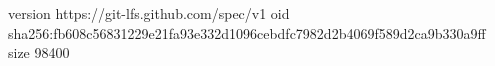 version https://git-lfs.github.com/spec/v1
oid sha256:fb608c56831229e21fa93e332d1096cebdfc7982d2b4069f589d2ca9b330a9ff
size 98400
